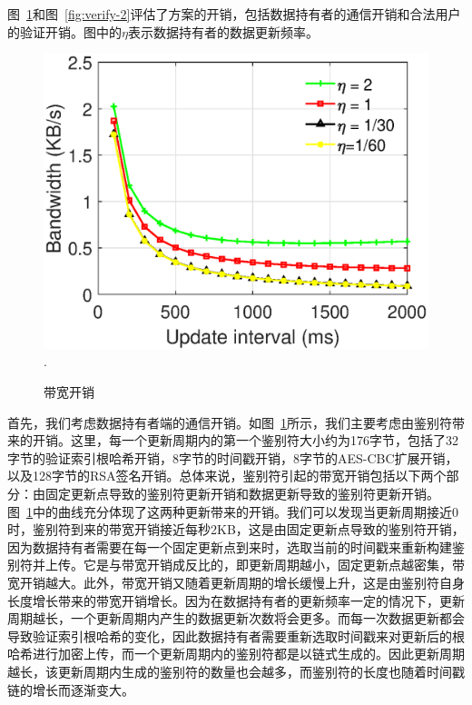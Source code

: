 图~\ref{fig:bandwidth}和图~\ref{fig:verify-2}评估了\multi 方案的开销，包括数据持有者的通信开销和合法用户的验证开销。图中的$\eta$表示数据持有者的数据更新频率。
\begin{figure}[h]
\centering
\includegraphics[width=3.5 in]{expr/bandwidth}
\DeclareGraphicsExtensions.
\caption{带宽开销}
\label{fig:bandwidth}
\end{figure}
首先，我们考虑数据持有者端的通信开销。如图~\ref{fig:bandwidth}所示，我们主要考虑由鉴别符带来的开销。这里，每一个更新周期内的第一个鉴别符大小约为176字节，包括了32字节的验证索引根哈希开销，8字节的时间戳开销，8字节的AES-CBC扩展开销，以及128字节的RSA签名开销。总体来说，鉴别符引起的带宽开销包括以下两个部分：由固定更新点导致的鉴别符更新开销和数据更新导致的鉴别符更新开销。
图~\ref{fig:bandwidth}中的曲线充分体现了这两种更新带来的开销。我们可以发现当更新周期接近0时，鉴别符到来的带宽开销接近每秒2KB，这是由固定更新点导致的鉴别符开销，因为数据持有者需要在每一个固定更新点到来时，选取当前的时间戳来重新构建鉴别符并上传。它是与带宽开销成反比的，即更新周期越小，固定更新点越密集，带宽开销越大。此外，带宽开销又随着更新周期的增长缓慢上升，这是由鉴别符自身长度增长带来的带宽开销增长。因为在数据持有者的更新频率一定的情况下，更新周期越长，一个更新周期内产生的数据更新次数将会更多。而每一次数据更新都会导致验证索引根哈希的变化，因此数据持有者需要重新选取时间戳来对更新后的根哈希进行加密上传，而一个更新周期内的鉴别符都是以链式生成的。因此更新周期越长，该更新周期内生成的鉴别符的数量也会越多，而鉴别符的长度也随着时间戳链的增长而逐渐变大。

